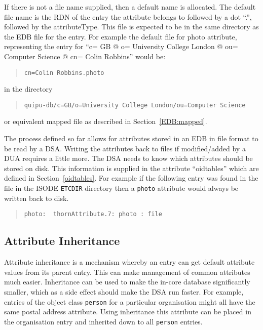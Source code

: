 If there is not a file name supplied, then a default name is allocated.
The default file name is the RDN of the entry the attribute belongs to
followed by a dot ``.'', followed by the attributeType. This file is expected
to be in the same directory as the EDB file for the entry.
For example the default file for photo attribute, representing the entry
for 
``c= GB @ o= University College London @ 
ou= Computer Science @ cn= Colin Robbins''
 would be:
\begin{quote}\small\begin{verbatim}
cn=Colin Robbins.photo
\end{verbatim}\end{quote}
in the directory
\begin{quote}\small\begin{verbatim}
quipu-db/c=GB/o=University College London/ou=Computer Science
\end{verbatim}\end{quote}
or equivalent mapped file as described in Section~\ref{EDB:mapped}.

The process defined so far allows for attributes stored in an EDB in file
format to be read by a DSA.
Writing the attributes back to files if modified/added by a DUA requires
a little more.
The DSA needs to know which attributes should be stored on disk.
This information is supplied in the attribute ``oidtables'' which are 
defined in Section~\ref{oidtables}.
For example if the following entry was found in the file
 in the ISODE \verb"ETCDIR" directory
then a \verb+photo+ attribute would always be written
back to disk.
\begin{quote}\small\begin{verbatim}
photo:  thornAttribute.7: photo : file
\end{verbatim}\end{quote}

\subsection {Attribute Inheritance}
\label{attr_inherit}

Attribute inheritance is a mechanism whereby an entry can get default
attribute values from its parent entry.
This can make management of common attributes much easier.
Inheritance can be used to make the in-core database significantly
smaller, which as a side effect should make the DSA run faster.    
For example, entries of the object class \verb+person+ for a particular
organisation might all have the same postal address attribute.
Using inheritance this attribute can be placed in the organisation entry
and inherited down to all \verb+person+ entries.

